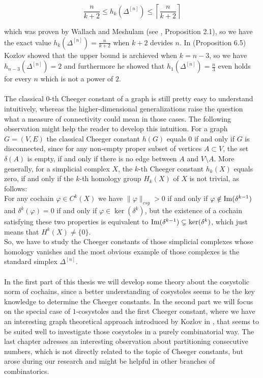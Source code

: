 \begin{equation}\label{equation1}
\frac{n}{k+2}\leq h_k(\Delta^{[n]})\leq\left\lceil\frac{n}{k+2}\right\rceil
\end{equation}

which was proven by Wallach and Meshulam (see \cite{4}, Proposition 2.1), so we have the exact value \(h_k(\Delta^{[n]})=\frac{n}{k+2}\) when \(k+2\) devides \(n\). In \cite{1} (Proposition 6.5) Kozlov showed that the upper bound is archieved when \(k=n-3\), so we have \(h_{n-3}(\Delta^{[n]})=2\) and furthermore he showed that \(h_1(\Delta^{[n]})=\frac{n}{3}\) even holds for every \(n\) which is not a power of \(2\).\\
\\
The classical \(0\)-th Cheeger constant of a graph is still pretty easy to understand intuitively, whereas the higher-dimensional generalizations raise the question what a measure of connectivity could mean in those cases. The following observation might help the reader to develop this intuition. For a graph \(G=(V,E)\) the classical Cheeger constant \(h(G)\) equals \(0\) if and only if \(G\) is disconnected, since for any non-empty proper subset of vertices \(A\subset V\), the set \(\delta(A)\) is empty, if and only if there is no edge between \(A\) and \(V\setminus A\). More generally, for a simplicial complex \(X\), the \(k\)-th Cheeger constant \(h_k(X)\) equals zero, if and only if the \(k\)-th homology group \(H_k(X)\) of \(X\) is not trivial, as follows:\\
For any cochain \(\varphi\in C^k(X)\) we have \(\|\varphi\|_{csy}>0\) if and only if \(\varphi\notin\mathrm{Im}(\delta^{k-1})\) and \(\delta^k(\varphi)=0\) if and only if \(\varphi\in\ker(\delta^k)\), but the existence of a cochain satisfying these two properties is equivalent to \(\mathrm{Im}(\delta^{k-1})\subsetneq\ker(\delta^k)\), which just means that \(H^k(X)\neq\{0\}\).\\
So, we have to study the Cheeger constants of those simplicial complexes whose homology vanishes and the most obvious example of those complexes is the standard simplex \(\Delta^{[n]}\).\\
\\
In the first part of this thesis we will develop some theory about the cosystolic norm of cochains, since a better understanding of cosystoles seems to be the key knowledge to determine the Cheeger constants. In the second part we will focus on the special case of \(1\)-cosystoles and the first Cheeger constant, where we have an interesting graph theoretical approach introduced by Kozlov in \cite{1}, that seems to be suited well to investigate those cosystoles in a purely combinatorial way. The last chapter adresses an interesting observation about partitioning consecutive numbers, which is not directly related to the topic of Cheeger constants, but arose during our research and might be helpful in other branches of combinatorics.

